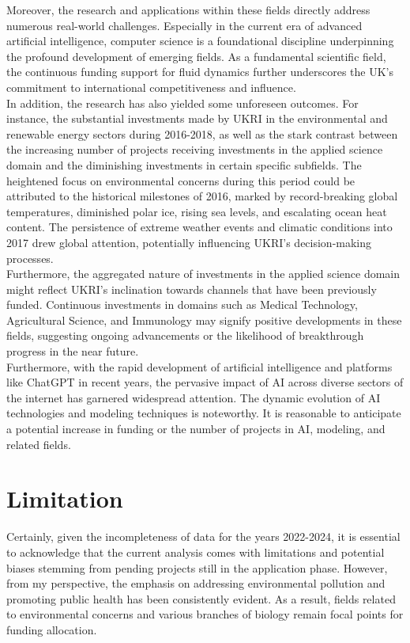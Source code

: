 Moreover, the research and applications within these fields directly address numerous real-world challenges. Especially in the current era of advanced artificial intelligence, computer science is a foundational discipline underpinning the profound development of emerging fields. As a fundamental scientific field, the continuous funding support for fluid dynamics further underscores the UK's commitment to international competitiveness and influence.\\

In addition, the research has also yielded some unforeseen outcomes. For instance, the substantial investments made by UKRI in the environmental and renewable energy sectors during 2016-2018, as well as the stark contrast between the increasing number of projects receiving investments in the applied science domain and the diminishing investments in certain specific subfields. The heightened focus on environmental concerns during this period could be attributed to the historical milestones of 2016, marked by record-breaking global temperatures, diminished polar ice, rising sea levels, and escalating ocean heat content. The persistence of extreme weather events and climatic conditions into 2017 drew global attention, potentially influencing UKRI's decision-making processes.\\

Furthermore, the aggregated nature of investments in the applied science domain might reflect UKRI's inclination towards channels that have been previously funded. Continuous investments in domains such as Medical Technology, Agricultural Science, and Immunology may signify positive developments in these fields, suggesting ongoing advancements or the likelihood of breakthrough progress in the near future.\\


Furthermore, with the rapid development of artificial intelligence and platforms like ChatGPT in recent years, the pervasive impact of AI across diverse sectors of the internet has garnered widespread attention. The dynamic evolution of AI technologies and modeling techniques is noteworthy. It is reasonable to anticipate a potential increase in funding or the number of projects in AI, modeling, and related fields.\\


\section*{Limitation}
Certainly, given the incompleteness of data for the years 2022-2024, it is essential to acknowledge that the current analysis comes with limitations and potential biases stemming from pending projects still in the application phase. However, from my perspective, the emphasis on addressing environmental pollution and promoting public health has been consistently evident. As a result, fields related to environmental concerns and various branches of biology remain focal points for funding allocation.\\


